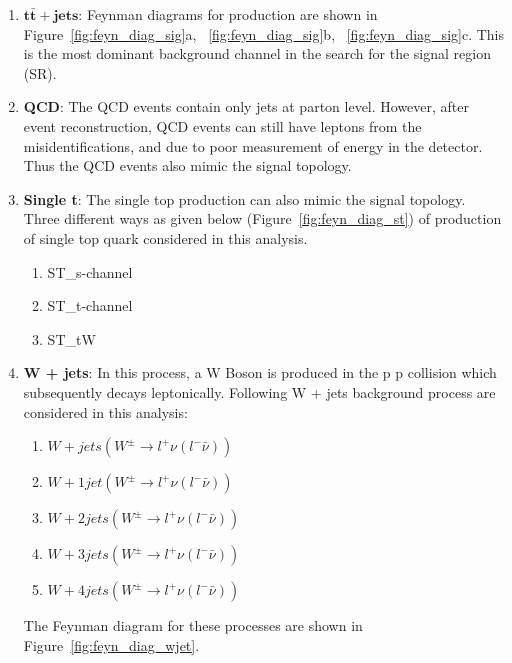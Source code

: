  \begin{enumerate}
     \item $\textbf{t}\bar{\textbf{t}} + \textbf{jets}$: Feynman diagrams for \ttjets production are shown in
       Figure~\ref{fig:feyn_diag_sig}a, ~\ref{fig:feyn_diag_sig}b, ~\ref{fig:feyn_diag_sig}c. This 
      is the most dominant background channel in the search for the signal region (SR).
   \item {\bf{QCD}}: The QCD events contain only jets at parton level. However, after
       event reconstruction, QCD events can still have leptons from the misidentifications,
       and \MET due to poor measurement of energy in the detector. Thus the QCD events also
       mimic the signal topology.
    
   \item {\bf{Single t}}: The single top production can also mimic the signal topology. Three 
       different ways as given below (Figure~\ref{fig:feyn_diag_st}) of production of single top 
       quark considered in this analysis.
   \begin{enumerate}
     \item ST\_s-channel
     \item ST\_t-channel
     \item ST\_tW
   \end{enumerate}

   \item {\bf{W + jets}}: In this process, a W Boson is produced in the p p collision 
       which subsequently decays leptonically. Following W + jets background process 
       are considered in this analysis:
   \begin{enumerate}
     \item $W + jets   (W^\pm \rightarrow l^+ \nu (l^-\bar{\nu}))$
     \item $W + 1 jet  (W^\pm \rightarrow l^+ \nu (l^-\bar{\nu}))$
     \item $W + 2 jets (W^\pm \rightarrow l^+ \nu (l^-\bar{\nu}))$
     \item $W + 3 jets (W^\pm \rightarrow l^+ \nu (l^-\bar{\nu}))$
     \item $W + 4 jets (W^\pm \rightarrow l^+ \nu (l^-\bar{\nu}))$
   \end{enumerate}
   The Feynman diagram for these processes are shown in Figure~\ref{fig:feyn_diag_wjet}.


\end{enumerate}
